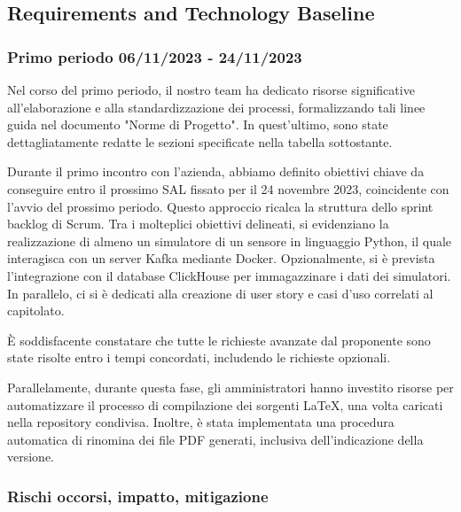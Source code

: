 \subsection{Requirements and Technology Baseline}
\subsubsection{Primo periodo  06/11/2023 - 24/11/2023}
    Nel corso del primo periodo, il nostro team ha dedicato risorse significative all'elaborazione e alla standardizzazione dei processi, formalizzando tali linee guida nel documento "Norme di Progetto". In quest'ultimo, sono state dettagliatamente redatte le sezioni specificate nella tabella sottostante.

    Durante il primo incontro con l'azienda, abbiamo definito obiettivi chiave da conseguire entro il prossimo SAL fissato per il 24 novembre 2023, coincidente con l'avvio del prossimo periodo. Questo approccio ricalca la struttura dello sprint backlog di Scrum.
    Tra i molteplici obiettivi delineati, si evidenziano la realizzazione di almeno un simulatore di un sensore in linguaggio Python, il quale interagisca con un server Kafka mediante Docker. Opzionalmente, si è prevista l'integrazione con il database ClickHouse per immagazzinare i dati dei simulatori. In parallelo, ci si è dedicati alla creazione di user story e casi d'uso correlati al capitolato.

    È soddisfacente constatare che tutte le richieste avanzate dal proponente sono state risolte entro i tempi concordati, includendo le richieste opzionali.

    Parallelamente, durante questa fase, gli amministratori hanno investito risorse per automatizzare il processo di compilazione dei sorgenti \LaTeX , una volta caricati nella repository condivisa. Inoltre, è stata implementata una procedura automatica di rinomina dei file PDF generati, inclusiva dell'indicazione della versione.

\subsubsection*{Rischi occorsi, impatto, mitigazione} 

